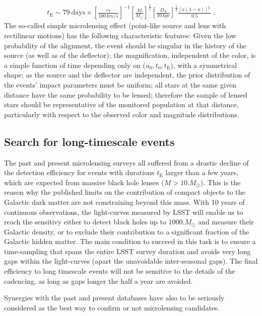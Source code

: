 \begin{eqnarray}
t_{\mathrm{E}} \sim
79\ \mathrm{days} \times %
\left[\frac{v_T}{100\, km/s}\right]^{-1}
\left[\frac{M}{M_\odot}\right]^{\frac{1}{2}}
\left[\frac{D_S}{10\, kpc}\right]^{\frac{1}{2}}
\frac{[x(1-x)]^{\frac{1}{2}}}{0.5}\; . %
\end{eqnarray}
The so-called simple microlensing effect (point-like source and lens
with rectilinear motions) has the following characteristic
features: 
Given the low probability of the alignment,
the event should be singular in the history of the source
(as well as of the deflector);
the magnification, independent of the color,
is a simple function of time
depending only on ($u_0, t_0, t_{\mathrm{E}}$),
with a symmetrical shape;
as the source and the deflector are independent,
the prior distribution of the events' impact parameters must be uniform;
all stars at the same given distance have the same probability to be lensed;
therefore the sample of lensed stars should be representative
of the monitored population at that distance, particularly with respect to
the observed color and magnitude distributions.

\subsection{Search for long-timescale events}
    
        The past and present microlensing surveys all suffered from a drastic decline of the
detection efficiency for events with durations $t_{\mathrm{E}}$ larger than a few years, which are expected from massive black hole lenses ($M>10.M_\odot$). This is the reason why the published limits on the contribution of compact objects to the Galactic dark matter are not constraining beyond this mass. With 10 years of continuous observations, the light-curves measured by LSST will enable us to reach the sensitivy either to detect black holes up to $1000.M_\odot$ and measure their Galactic density, or to exclude their contribution to a significant fraction of the Galactic hidden matter.
The main condition to succeed in this task is to ensure a time-sampling that spans the entire LSST survey duration and avoids very long gaps within the light-curves (apart the unavoidable inter-seasonal gaps). The final efficiency to long timescale events will not be sensitive to the details of the cadencing, as long as gaps longer the half a year are avoided.

Synergies with the past and present databases have also to be seriously considered as the best way to confirm or not microlensing candidates.

